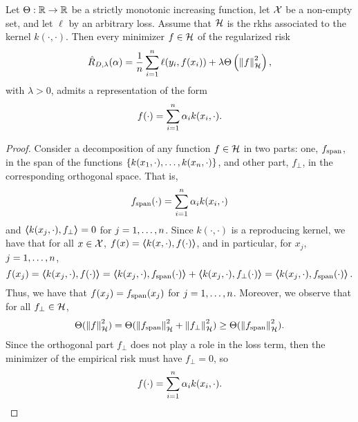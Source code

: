 \begin{theorem}\label{th:repr_theorem}
    Let $\Theta: \mathbb{R} \to \mathbb{R}$ be a strictly monotonic increasing function, let $\mathcal{X}$ be a non-empty set, and let $\ell$ by an arbitrary loss. Assume that $\mathcal{H}$ is the \acrshort{rkhs} associated to the kernel $k(\cdot, \cdot)$.
    Then every minimizer $f \in \mathcal{H}$ of the regularized risk 
    \begin{equation}
        \nonumber
        \hat{R}_{D, \lambda}(\alpha) = \frac{1}{n} \sum_{i=1}^n \ell(y_i, f(x_i)) + \lambda \Theta\left(\left\lVert f\right\rVert^2_{\mathcal{H}} \right) ,
    \end{equation}
    with $\lambda > 0$, admits a representation of the form
    \begin{equation}
        \label{eq:reprth_def}
        f(\cdot) = \sum_{i=1}^\nsamples \alpha_i k(x_i, \cdot) .
    \end{equation}
\end{theorem}
\begin{proof}
    Consider a decomposition of any function $f \in \mathcal{H}$ in two parts: one, $f_{\operatorname{span}}$, in the span of the functions $\left\{k(x_1, \cdot), \ldots, k(x_n, \cdot)\right\}$, and other part, $f_{\perp}$, in the corresponding orthogonal space. That is,
    \begin{equation}
        \nonumber
        f_{\operatorname{span}}(\cdot) = \sum_{i=1}^n \alpha_i k(x_i, \cdot)
    \end{equation}
    and $\bm{\left\langle} k(x_j, \cdot), f_{\perp} \bm{\right\rangle} = 0$ for $j=1, \ldots, n$.
%
    Since $k(\cdot, \cdot)$ is a reproducing kernel, we have that for all $x \in \mathcal{X}$, 
    $f(x) = \bm{\left\langle} k(x, \cdot), f(\cdot) \bm{\right\rangle}$, and in particular, for $x_j$, $j=1, \ldots, n$,
    \begin{equation}
        \nonumber
        f(x_j) = \bm{\left\langle} k(x_j, \cdot), f(\cdot) \bm{\right\rangle} = \bm{\left\langle} k(x_j, \cdot), f_{\operatorname{span}}(\cdot) \bm{\right\rangle} + \bm{\left\langle} k(x_j, \cdot), f_{\perp}(\cdot) \bm{\right\rangle} = \bm{\left\langle} k(x_j, \cdot), f_{\operatorname{span}}(\cdot) \bm{\right\rangle}.
    \end{equation}
    Thus, we have that $f(x_j) = f_{\operatorname{span}}(x_j)$ for $j=1, \ldots, n$.
    Moreover, we observe that for all $f_{\perp} \in \mathcal{H}$,
    \begin{equation}
        \nonumber
        \Theta(\left\lVert f\right\rVert_{\mathcal{H}}^2) = \Theta(\left\lVert f_{\operatorname{span}}\right\rVert_{\mathcal{H}}^2 + \left\lVert f_{\perp}\right\rVert_{\mathcal{H}}^2) \geq \Theta(\left\lVert f_{\operatorname{span}}\right\rVert_{\mathcal{H}}^2) .
    \end{equation}
    Since the orthogonal part $f_{\perp}$ does not play a role in the loss term, then the minimizer of the empirical risk must have $f_{\perp} = 0$, so 
    $$ f(\cdot) = \sum_{i=1}^n \alpha_i k(x_i, \cdot).$$
\end{proof}
